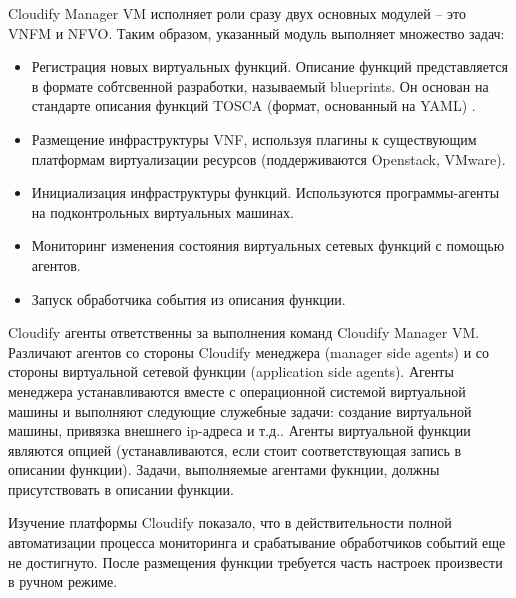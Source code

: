 \documentclass[oneside,final,14pt,a4paper]{extreport}
\begin{document}
Cloudify Manager VM исполняет роли сразу двух основных модулей -- это VNFM и NFVO. Таким образом, указанный модуль выполняет множество задач:
\begin{itemize}
	\item Регистрация новых виртуальных функций. Описание функций представляется в формате собтсвенной разработки, называемый blueprints. Он основан на стандарте описания функций TOSCA (формат, основанный на YAML) \cite{bib:tosca}.
	\item Размещение инфраструктуры VNF, используя плагины к существующим платформам виртуализации ресурсов (поддерживаются Openstack, VMware).
	\item Инициализация инфраструктуры функций. Используются программы-агенты на подконтрольных виртуальных машинах.
	\item Мониторинг изменения состояния виртуальных сетевых функций с помощью агентов.
	\item Запуск обработчика события из описания функции.
\end{itemize}

Cloudify агенты ответственны за выполнения команд Cloudify Manager VM. Различают агентов со стороны Cloudify менеджера (manager side agents) и со стороны виртуальной сетевой функции (application side agents). Агенты менеджера устанавливаются вместе с операционной системой виртуальной машины и выполняют следующие служебные задачи: создание виртуальной машины, привязка внешнего ip-адреса и т.д.. Агенты виртуальной функции являются опцией (устанавливаются, если стоит соответствующая запись в описании функции). Задачи, выполняемые агентами фукнции, должны присутствовать в описании функции.\cite{cloudify-official-oveview1}

Изучение платформы Cloudify показало, что в действительности полной автоматизации процесса мониторинга и срабатывание обработчиков событий еще не достигнуто. После размещения функции требуется часть настроек произвести в ручном режиме. 
\end{document}
